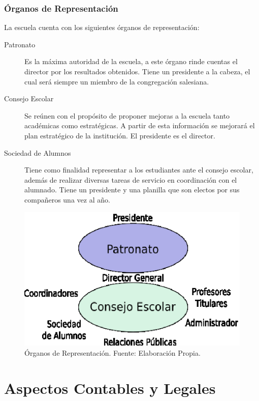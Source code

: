 
\clearpage

\subsubsection{Órganos de Representación}

La escuela cuenta con los siguientes órganos de representación:

\begin{description}
	\item[Patronato]
		Es la máxima autoridad de la escuela, a este órgano rinde cuentas el director por los resultados obtenidos. Tiene un presidente a la cabeza, el cual será siempre un miembro de la congregación salesiana.
	\item[Consejo Escolar]
		Se reúnen con el propósito de proponer mejoras a la escuela tanto académicas como estratégicas. A partir de esta información se mejorará el plan estratégico de la institución. El presidente es el director.
	\item[Sociedad de Alumnos]
		Tiene como finalidad representar a los estudiantes ante el consejo escolar, además de realizar diversas tareas de servicio en coordinación con el alumnado. Tiene un presidente y una planilla que son electos por sus compañeros una vez al año.
\end{description}

\begin{figure}[h]
	\centering
	\includegraphics{images/organos}
	\caption{Órganos de Representación. Fuente: Elaboración Propia.}
	\label{fig:Org:Organos}
\end{figure}
\clearpage

\section{Aspectos Contables y Legales}

